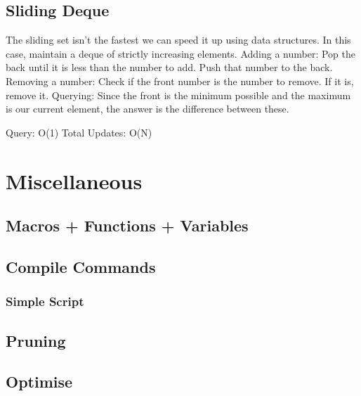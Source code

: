 \documentclass{article}
\begin{document}
\subsection{Sliding Deque}
\begin{flushleft}
The sliding set isn't the fastest we can speed it up using data structures.
In this case, maintain a deque of strictly increasing elements.
\newline
Adding a number: Pop the back until it is less than the number to add. Push that number to the back.
Removing a number: Check if the front number is the number to remove. If it is, remove it.
Querying: Since the front is the minimum possible and the maximum is our current element, the answer is the difference between these.

Query: O(1)
Total Updates: O(N)
\end{flushleft}


\section{Miscellaneous}
\subsection{Macros + Functions + Variables}


\subsection{Compile Commands}

\subsubsection{Simple Script}


\subsection{Pruning}


\subsection{Optimise}

\end{document}
